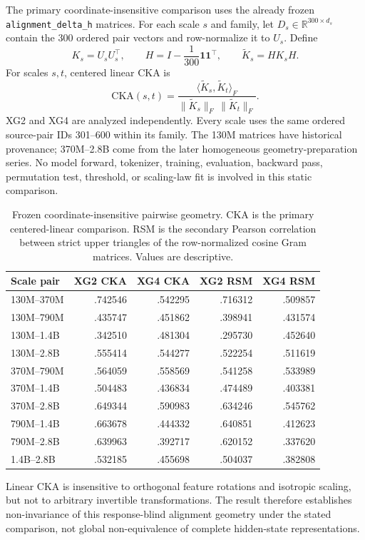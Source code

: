 The primary coordinate-insensitive comparison uses the already frozen
\texttt{alignment\_delta\_h} matrices. For each scale $s$ and family, let
$D_s\in\mathbb{R}^{300\times d_s}$ contain the 300 ordered pair vectors and row-normalize it to $U_s$. Define
\[
K_s=U_sU_s^\top,\qquad
H=I-\frac{1}{300}\mathbf{1}\mathbf{1}^\top,
\qquad
\widetilde K_s=HK_sH.
\]
For scales $s,t$, centered linear CKA is
\[
\mathrm{CKA}(s,t)
=
\frac{\langle \widetilde K_s,\widetilde K_t\rangle_F}
{\|\widetilde K_s\|_F\,\|\widetilde K_t\|_F}.
\]
XG2 and XG4 are analyzed independently. Every scale uses the same ordered source-pair IDs 301--600 within its family. The 130M matrices have historical provenance; 370M--2.8B come from the later homogeneous geometry-preparation series. No model forward, tokenizer, training, evaluation, backward pass, permutation test, threshold, or scaling-law fit is involved in this static comparison.

\begin{table}[h]
\centering\scriptsize
\caption{Frozen coordinate-insensitive pairwise geometry. CKA is the primary centered-linear comparison. RSM is the secondary Pearson correlation between strict upper triangles of the row-normalized cosine Gram matrices. Values are descriptive.}
\label{tab:cka}
\begin{tabular}{lrrrr}
\toprule
Scale pair & XG2 CKA & XG4 CKA & XG2 RSM & XG4 RSM \\
\midrule
130M--370M & .742546 & .542295 & .716312 & .509857 \\
130M--790M & .435747 & .451862 & .398941 & .431574 \\
130M--1.4B & .342510 & .481304 & .295730 & .452640 \\
130M--2.8B & .555414 & .544277 & .522254 & .511619 \\
370M--790M & .564059 & .558569 & .541258 & .533989 \\
370M--1.4B & .504483 & .436834 & .474489 & .403381 \\
370M--2.8B & .649344 & .590983 & .634246 & .545762 \\
790M--1.4B & .663678 & .444332 & .640851 & .412623 \\
790M--2.8B & .639963 & .392717 & .620152 & .337620 \\
1.4B--2.8B & .532185 & .455698 & .504037 & .382808 \\
\bottomrule
\end{tabular}
\end{table}

Linear CKA is insensitive to orthogonal feature rotations and isotropic scaling, but not to arbitrary invertible transformations. The result therefore establishes non-invariance of this response-blind alignment geometry under the stated comparison, not global non-equivalence of complete hidden-state representations.

